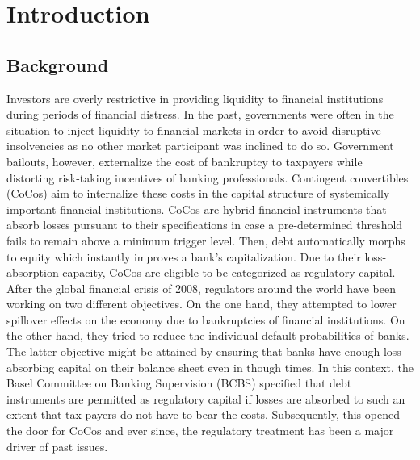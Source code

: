 \chapter{Introduction}

\section{Background}
Investors are overly restrictive in providing liquidity to financial institutions during periods of financial distress. In the past, governments were often in the situation to inject liquidity to financial markets in order to avoid disruptive insolvencies as no other market participant was inclined to do so. Government bailouts, however, externalize the cost of bankruptcy to taxpayers while distorting risk-taking incentives of banking professionals. Contingent convertibles (CoCos) aim to internalize these costs in the capital structure of systemically important financial institutions. CoCos are hybrid financial instruments that absorb losses pursuant to their specifications in case a pre-determined threshold fails to remain above a minimum trigger level. Then, debt automatically morphs to equity which instantly improves a bank's capitalization. Due to their loss-absorption capacity, CoCos are eligible to be categorized as regulatory capital. \citep{avdjiev2013cocos} \\

After the global financial crisis of 2008, regulators around the world have been working on two different objectives. On the one hand, they attempted to lower spillover effects on the economy due to bankruptcies of financial institutions. On the other hand, they tried to reduce the individual default probabilities of banks. The latter objective might be attained by ensuring that banks have enough loss absorbing capital on their balance sheet even in though times. \citep{de2011handbook} In this context, the Basel Committee on Banking Supervision (BCBS) specified that debt instruments are permitted as regulatory capital if losses are absorbed to such an extent that tax payers do not have to bear the costs. \citep{basel2011press} Subsequently, this opened the door for CoCos and ever since, the regulatory treatment has been a major driver of past issues.


